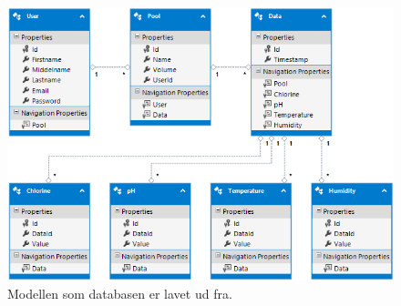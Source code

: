 \begin{figure}[H]
\centering
\includegraphics[width=\linewidth]{figs/db_model}
\caption{Modellen som databasen er lavet ud fra.}
\label{fig:dbmodel}
\end{figure}